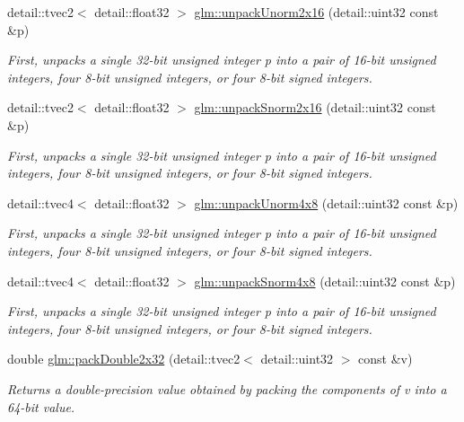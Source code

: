\begin{DoxyCompactItemize}
detail\-::tvec2$<$ detail\-::float32 $>$ \hyperlink{group__core__func__packing_gaa0b6b63ebe8cd5899b277bce84237ad1}{glm\-::unpack\-Unorm2x16} (detail\-::uint32 const \&p)
\begin{DoxyCompactList}\small\item\em First, unpacks a single 32-\/bit unsigned integer p into a pair of 16-\/bit unsigned integers, four 8-\/bit unsigned integers, or four 8-\/bit signed integers. \end{DoxyCompactList}\item 
detail\-::tvec2$<$ detail\-::float32 $>$ \hyperlink{group__core__func__packing_gafeb2843ce77c028f30ef5acb02e7aa2c}{glm\-::unpack\-Snorm2x16} (detail\-::uint32 const \&p)
\begin{DoxyCompactList}\small\item\em First, unpacks a single 32-\/bit unsigned integer p into a pair of 16-\/bit unsigned integers, four 8-\/bit unsigned integers, or four 8-\/bit signed integers. \end{DoxyCompactList}\item 
detail\-::tvec4$<$ detail\-::float32 $>$ \hyperlink{group__core__func__packing_ga88febf67bc78f5ad96735b0ca9cbb073}{glm\-::unpack\-Unorm4x8} (detail\-::uint32 const \&p)
\begin{DoxyCompactList}\small\item\em First, unpacks a single 32-\/bit unsigned integer p into a pair of 16-\/bit unsigned integers, four 8-\/bit unsigned integers, or four 8-\/bit signed integers. \end{DoxyCompactList}\item 
detail\-::tvec4$<$ detail\-::float32 $>$ \hyperlink{group__core__func__packing_ga9a43a9dd70403585d73627ddec6a85ff}{glm\-::unpack\-Snorm4x8} (detail\-::uint32 const \&p)
\begin{DoxyCompactList}\small\item\em First, unpacks a single 32-\/bit unsigned integer p into a pair of 16-\/bit unsigned integers, four 8-\/bit unsigned integers, or four 8-\/bit signed integers. \end{DoxyCompactList}\item 
double \hyperlink{group__core__func__packing_ga3b29a2a13aeb1e9118d4a7f03597228e}{glm\-::pack\-Double2x32} (detail\-::tvec2$<$ detail\-::uint32 $>$ const \&v)
\begin{DoxyCompactList}\small\item\em Returns a double-\/precision value obtained by packing the components of v into a 64-\/bit value. \end{DoxyCompactList}\item 

\end{DoxyCompactItemize}
